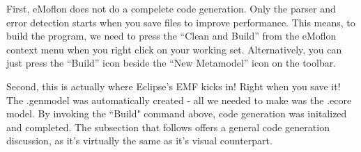 First, eMoflon does not do a compelete code generation. Only the parser and error detection starts when you save files to improve performance. This means, to build the program, we need to press the ``Clean and Build'' from the eMoflon context menu when you right click on your working set. Alternatively, you can just press the ``Build'' icon beside the ``New Metamodel'' icon on the toolbar. 

Second, this is actually where Eclipse's EMF kicks in! Right when you save it! The .genmodel was automatically created - all we needed to make was the .ecore model. By invoking the ``Build" command above, code generation was initalized and completed. The subsection that follows offers a general code generation discussion, as it's virtually the same as it's visual counterpart.